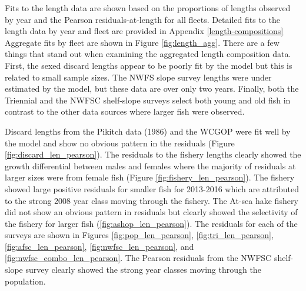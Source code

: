 \documentclass[12pt,]{article}
\begin{document}
Fits to the length data are shown based on the proportions of lengths
observed by year and the Pearson residuals-at-length for all fleets.
Detailed fits to the length data by year and fleet are provided in
Appendix \ref{length-compositions} Aggregate fits by fleet are shown in
Figure \ref{fig:length_agg}. There are a few things that stand out when
examining the aggregated length composition data. First, the sexed
discard lengths appear to be poorly fit by the model but this is related
to small sample sizes. The NWFS slope survey lengths were under
estimated by the model, but these data are over only two years. Finally,
both the Triennial and the NWFSC shelf-slope surveys select both young
and old fish in contrast to the other data sources where larger fish
were observed.

Discard lengths from the Pikitch data (1986) and the WCGOP were fit well
by the model and show no obvious pattern in the residuals (Figure
\ref{fig:discard_len_pearson}). The residuals to the fishery lengths
clearly showed the growth differential between males and females where
the majority of residuals at larger sizes were from female fish (Figure
\ref{fig:fishery_len_pearson}). The fishery showed large positive
residuals for smaller fish for 2013-2016 which are attributed to the
strong 2008 year class moving through the fishery. The At-sea hake
fishery did not show an obvious pattern in residuals but clearly showed
the selectivity of the fishery for larger fish
(\ref{fig:ashop_len_pearson}). The residuals for each of the surveys are
shown in Figures \ref{fig:pop_len_pearson}, \ref{fig:tri_len_pearson},
\ref{fig:afsc_len_pearson}, \ref{fig:nwfsc_len_pearson}, and
\ref{fig:nwfsc_combo_len_pearson}. The Pearson residuals from the NWFSC
shelf-slope survey clearly showed the strong year classes moving through
the population.
\end{document}
